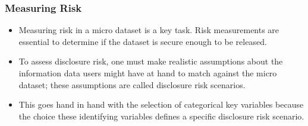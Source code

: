 \documentclass{beamer}
\begin{document}
\begin{frame}	
\frametitle{Measuring Risk}
\begin{itemize}
\item Measuring risk in a micro dataset is a key task. Risk measurements are essential
	to determine if the dataset is secure enough to be released. 
\item To assess disclosure
	risk, one must make realistic assumptions about the information data users might
	have at hand to match against the micro dataset; these assumptions are called
	disclosure risk scenarios. 
\item This goes hand in hand with the selection of categorical
	key variables because the choice these identifying variables deﬁnes a speciﬁc disclosure risk scenario. 
\end{itemize}
\end{frame}
\end{document}

